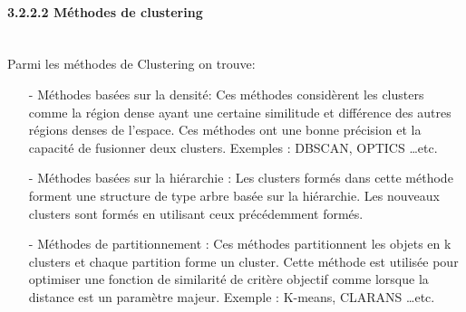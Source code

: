 \paragraph{{\large 3.2.2.2 Méthodes de clustering}\\\\}
Parmi les méthodes de Clustering on trouve:\\
\begin{itemize}
\item[-]Méthodes basées sur la densité: Ces méthodes considèrent les clusters comme la région dense ayant une certaine similitude et différence des autres régions denses de l'espace. Ces méthodes ont une bonne précision et la capacité de fusionner deux clusters. Exemples : DBSCAN, OPTICS …etc.\\
\item[-]Méthodes basées sur la hiérarchie : Les clusters formés dans cette méthode forment une structure de type arbre basée sur la hiérarchie. Les nouveaux clusters sont formés en utilisant ceux précédemment formés.\\
\item[-]Méthodes de partitionnement : Ces méthodes partitionnent les objets en k clusters et chaque partition forme un cluster. Cette méthode est utilisée pour optimiser une fonction de similarité de critère objectif comme lorsque la distance est un paramètre majeur. Exemple : K-means, CLARANS …etc.
\end{itemize}

